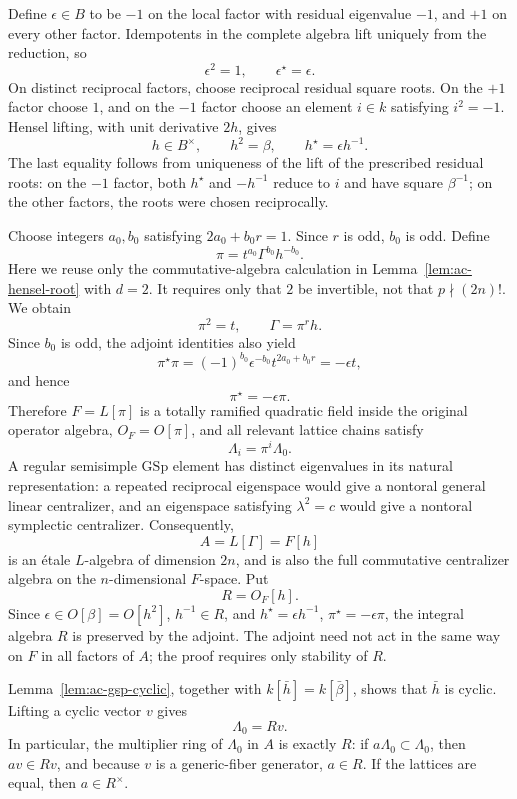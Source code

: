\documentclass[11pt,a4paper]{article}
\theoremstyle{definition}
\theoremstyle{remark}
\begin{document}
Define \(\epsilon\in B\) to be \(-1\) on the local factor with residual
eigenvalue \(-1\), and \(+1\) on every other factor. Idempotents in the
complete algebra lift uniquely from the reduction, so
\[
\epsilon^2=1,\qquad \epsilon^\star=\epsilon.
\]
On distinct reciprocal factors, choose reciprocal residual square
roots. On the \(+1\) factor choose \(1\), and on the \(-1\) factor choose
an element \(i\in k\) satisfying \(i^2=-1\). Hensel lifting, with unit
derivative \(2h\), gives
\[
h\in B^\times,\qquad h^2=\beta,\qquad
h^\star=\epsilon h^{-1}.
\]
The last equality follows from uniqueness of the lift of the prescribed
residual roots: on the \(-1\) factor, both \(h^\star\) and \(-h^{-1}\)
reduce to \(i\) and have square \(\beta^{-1}\); on the other factors, the
roots were chosen reciprocally.

Choose integers \(a_0,b_0\) satisfying \(2a_0+b_0r=1\). Since \(r\) is
odd, \(b_0\) is odd. Define
\[
\pi=t^{a_0}\Gamma^{b_0}h^{-b_0}.
\]
Here we reuse only the commutative-algebra calculation in
Lemma~\ref{lem:ac-hensel-root} with \(d=2\). It requires only that \(2\)
be invertible, not that \(p\nmid(2n)!\). We obtain
\[
\pi^2=t,\qquad \Gamma=\pi^r h.
\]
Since \(b_0\) is odd, the adjoint identities also yield
\[
\pi^\star\pi
=(-1)^{b_0}\epsilon^{-b_0}t^{2a_0+b_0r}
=-\epsilon t,
\]
and hence
\[
\pi^\star=-\epsilon\pi.
\]
Therefore \(F=L[\pi]\) is a totally ramified quadratic field inside the
original operator algebra, \(O_F=O[\pi]\), and all relevant lattice
chains satisfy
\[
\Lambda_i=\pi^i\Lambda_0.
\]
A regular semisimple \(\mathrm{GSp}\) element has distinct eigenvalues
in its natural representation: a repeated reciprocal eigenspace would
give a nontoral general linear centralizer, and an eigenspace satisfying
\(\lambda^2=c\) would give a nontoral symplectic centralizer. Consequently,
\[
A=L[\Gamma]=F[h]
\]
is an \'etale \(L\)-algebra of dimension \(2n\), and is also the full
commutative centralizer algebra on the \(n\)-dimensional \(F\)-space.
Put
\[
R=O_F[h].
\]
Since \(\epsilon\in O[\beta]=O[h^2]\), \(h^{-1}\in R\), and
\(h^\star=\epsilon h^{-1}\), \(\pi^\star=-\epsilon\pi\), the integral
algebra \(R\) is preserved by the adjoint. The adjoint need not act in
the same way on \(F\) in all factors of \(A\); the proof requires only
stability of \(R\).

Lemma~\ref{lem:ac-gsp-cyclic}, together with
\(k[\bar h]=k[\bar\beta]\), shows that \(\bar h\) is cyclic. Lifting a
cyclic vector \(v\) gives
\[
\Lambda_0=Rv.
\]
In particular, the multiplier ring of \(\Lambda_0\) in \(A\) is exactly
\(R\): if \(a\Lambda_0\subset\Lambda_0\), then \(av\in Rv\), and because
\(v\) is a generic-fiber generator, \(a\in R\). If the lattices are equal,
then \(a\in R^\times\).
\end{document}
